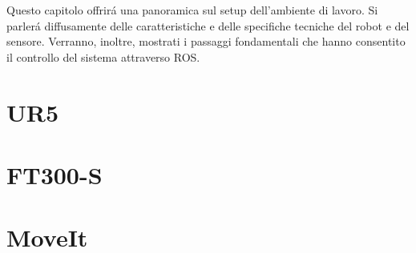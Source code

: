 Questo capitolo offrir\'{a} una panoramica sul setup dell'ambiente di lavoro. 
Si parler\'{a} diffusamente delle caratteristiche e delle specifiche tecniche del robot e del sensore. Verranno, inoltre, 
mostrati i passaggi fondamentali che hanno consentito il controllo del sistema attraverso ROS.

\section{UR5}


\section{FT300-S}


\section{MoveIt}
